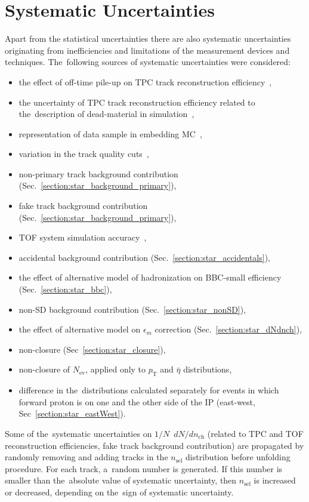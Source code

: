 \chapter{Systematic Uncertainties}\label{section:star_systematics}
Apart from the statistical uncertainties there are also systematic uncertainties originating from inefficiencies and limitations of the measurement devices and techniques. The~following sources of systematic uncertainties were considered:
\begin{itemize}
	\item the effect of off-time pile-up on TPC track reconstruction efficiency~\cite{supplementaryNote},
	\item the uncertainty of TPC track reconstruction efficiency related to the~description of dead-material in simulation~\cite{supplementaryNote},
	\item representation of data sample in embedding MC~\cite{supplementaryNote},
	\item variation in the track quality cuts~\cite{supplementaryNote},
	\item non-primary track background contribution (Sec.~\ref{section:star_background_primary}),
	\item fake track background contribution (Sec.~\ref{section:star_background_primary}),
	\item TOF system simulation accuracy~\cite{supplementaryNote},
	\item accidental background contribution (Sec.~\ref{section:star_accidentals}),
	\item the effect of alternative model of hadronization on BBC-small efficiency (Sec.~\ref{section:star_bbc}),
	\item non-SD background contribution (Sec.~\ref{section:star_nonSD}),
	\item the effect of alternative model  on $\epsilon_{ m}$ correction (Sec.~\ref{section:star_dNdnch}),
	\item non-closure (Sec~\ref{section:star_closure}),
	\item non-closure of $N_\textrm{ev}$, applied only to $p_\textrm{T}$ and $\bar{\eta}$ distributions,
	\item difference in the~distributions calculated separately for events in which forward proton is on one and the other side of the IP (east-west, Sec~\ref{section:star_eastWest}).
\end{itemize}

Some of the~systematic uncertainties on $1/N$~$dN/dn_\textrm{ch}$ (related to TPC and TOF reconstruction efficiencies, fake track background contribution)  are propagated by randomly removing and adding tracks in the $n_\textrm{sel}$ distribution before  unfolding procedure. For each track, a~random number is generated. If this number is smaller than the~absolute value of systematic uncertainty, then $n_\textrm{sel}$ is increased or decreased, depending on the~sign of systematic uncertainty.



